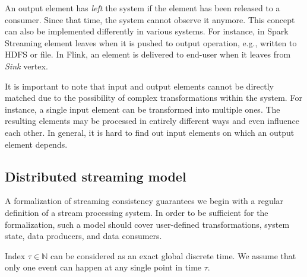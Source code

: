 An output element has {\em left} the system if the element has been released to a consumer. 
Since that time, the system cannot observe it anymore. This concept can also be implemented differently in various systems. For instance, in Spark Streaming element leaves when it is pushed to output operation, e.g., written to HDFS or file. In Flink, an element is delivered to end-user when it leaves from {\em Sink} vertex.   

It is important to note that input and output elements cannot be directly matched due to the possibility of complex transformations within the system. 
For instance, a single input element can be transformed into multiple ones.  The resulting elements may be processed in entirely different ways and even influence each other. 
In general, it is hard to find out input elements on which an output element depends. 

\subsection{Distributed streaming model}

A formalization of streaming consistency guarantees we begin with a regular definition of a stream processing system. In order to be sufficient for the formalization, such a model should cover user-defined transformations, system state, data producers, and data consumers.

Index $\tau\in{\mathbb{N}}$ can be considered as an exact global discrete time. We assume that only one event can happen at any single point in time $\tau$.

